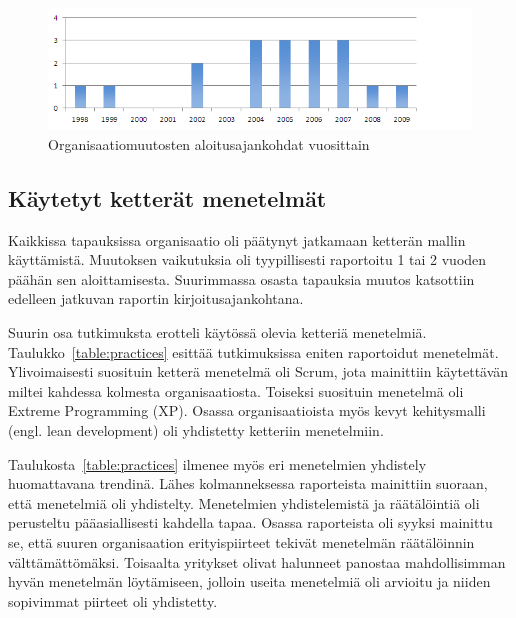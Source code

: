 \begin{figure}[htb]
  \begin{center}
    \includegraphics[width=1\textwidth]{img/Transformation_start}
    \caption{Organisaatiomuutosten aloitusajankohdat vuosittain}
    \label{fig:start_year}
  \end{center}
\end{figure}

\subsection{Käytetyt ketterät menetelmät}

Kaikkissa tapauksissa organisaatio oli päätynyt jatkamaan ketterän mallin
käyttämistä. Muutoksen vaikutuksia oli tyypillisesti raportoitu 1 tai 2 vuoden
päähän sen aloittamisesta. Suurimmassa osasta tapauksia muutos katsottiin
edelleen jatkuvan raportin kirjoitusajankohtana.

Suurin osa tutkimuksta erotteli käytössä olevia ketteriä menetelmiä.
Taulukko~\ref{table:practices} esittää tutkimuksissa eniten raportoidut
menetelmät. Ylivoimaisesti suosituin ketterä menetelmä oli Scrum, jota
mainittiin käytettävän miltei kahdessa kolmesta organisaatiosta. Toiseksi
suosituin menetelmä oli Extreme Programming (XP). Osassa organisaatioista myös
kevyt kehitysmalli (engl. lean development) oli yhdistetty ketteriin
menetelmiin.

Taulukosta~\ref{table:practices} ilmenee myös eri menetelmien yhdistely
huomattavana trendinä. Lähes kolmanneksessa raporteista mainittiin suoraan, että
menetelmiä oli yhdistelty. Menetelmien yhdistelemistä ja räätälöintiä oli
perusteltu pääasiallisesti kahdella tapaa. Osassa raporteista oli syyksi
mainittu se, että suuren organisaation erityispiirteet tekivät menetelmän
räätälöinnin välttämättömäksi. Toisaalta yritykset olivat halunneet panostaa
mahdollisimman hyvän menetelmän löytämiseen, jolloin useita menetelmiä oli
arvioitu ja niiden sopivimmat piirteet oli yhdistetty.

